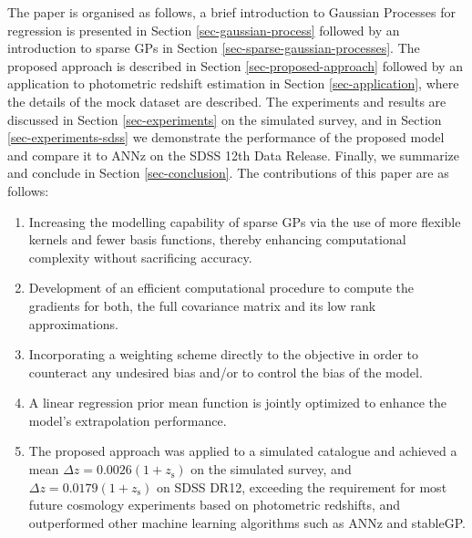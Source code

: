 \documentclass[useAMS,usenatbib,fleqn]{mn2e}
\begin{document}
The paper is organised as follows, a brief introduction to Gaussian Processes for regression is presented in Section \ref{sec-gaussian-process} followed by an introduction to sparse GPs in Section \ref{sec-sparse-gaussian-processes}. The proposed approach is described in Section \ref{sec-proposed-approach} followed by an application to photometric redshift estimation in Section \ref{sec-application}, where the details of the mock dataset are described. The experiments and results are discussed in Section \ref{sec-experiments} on the simulated survey, and in Section \ref{sec-experiments-sdss} we demonstrate the performance of the proposed model and compare it to ANNz on the SDSS 12th Data Release. Finally, we summarize and conclude in Section \ref{sec-conclusion}. The contributions of this paper are as follows:
\begin{enumerate}
  \item Increasing the modelling capability of sparse GPs via the use of more flexible kernels and fewer basis functions, thereby enhancing computational complexity without sacrificing accuracy.
  \item Development of an efficient computational procedure to compute the gradients for both, the full covariance matrix and its low rank approximations.
  \item Incorporating a weighting scheme directly to the objective in order to counteract any undesired bias and/or to control the bias of the model. 
  \item A linear regression prior mean function is jointly optimized to enhance the model's extrapolation performance.
  \item The proposed approach was applied to a simulated catalogue and achieved  a mean $\Delta z = 0.0026(1+z_\textrm{s})$ on the simulated survey, and  $\Delta z = 0.0179(1+z_\textrm{s})$ on SDSS DR12, exceeding the requirement for most future cosmology experiments based on photometric redshifts, and outperformed other machine learning algorithms such as {\sc ANNz} and {\sc stableGP}.
\end{enumerate}
\end{document}
